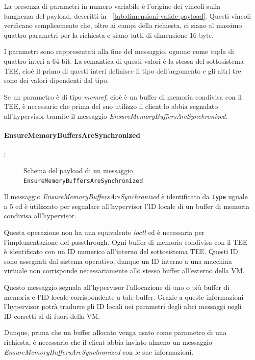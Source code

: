 \documentclass[12pt,italian]{report}
\begin{document}
La presenza di parametri in numero variabile è l'origine dei vincoli
sulla lunghezza del payload, descritti in
\tablename~\ref{tab:dimensioni-valide-payload}.
Questi vincoli verificano semplicemente che, oltre ai campi della
richiesta, ci siano al massimo quattro parametri per la richiesta e siano
tutti di dimensione 16 byte.

I parametri sono rappresentati alla fine del messaggio, ognuno come tupla
di quattro interi a 64 bit.
La semantica di questi valori è la stessa del sottosistema TEE, cioè il
primo di questi interi definisce il tipo dell'argomento e gli
altri tre sono dei valori dipendenti dal tipo.

Se un parametro è di tipo \textit{memref}, cioè è un buffer di memoria
condivisa con il TEE, è necessario che prima del suo utilizzo il client
lo abbia segnalato all'hypervisor tramite il messaggio
\textit{EnsureMemoryBuffersAreSynchronized}.

\paragraph{EnsureMemoryBuffersAreSynchronized}: \\
\begin{figure}[H]
    \centering
    \caption{
        Schema del payload di un messaggio
        \texttt{EnsureMemoryBuffersAreSynchronized}}
    \label{fig:msg-schema-embas}
\end{figure}
Il messaggio \textit{EnsureMemoryBuffersAreSynchronized} è identificato da
\texttt{type} uguale a $5$ ed è utilizzato per segnalare all'hypervisor
l'ID locale di un buffer di memoria condivisa all'hypervisor.

Questa operazione non ha una equivalente \textit{ioctl} ed è necessaria
per l'implementazione del passthrough.
Ogni buffer di memoria condivisa con il TEE è identificato con un ID numerico
all'interno del sottosistema TEE.
Questi ID sono assegnati dal sistema operativo, dunque un ID interno a una
macchina virtuale non corrisponde necessariamente allo stesso buffer
all'esterno della VM.

Questo messaggio segnala all'hypervisor l'allocazione di uno o più buffer di
memoria e l'ID locale corrispondente a tale buffer.
Grazie a queste informazioni l'hypervisor potrà tradurre gli ID locali nei
parametri degli altri messaggi negli ID corretti al di fuori della VM.

Dunque, prima che un buffer allocato venga usato come parametro di una
richiesta,
è necessario che il client abbia inviato almeno un messaggio
\textit{EnsureMemoryBuffersAreSynchronized} con le sue informazioni.
\end{document}
